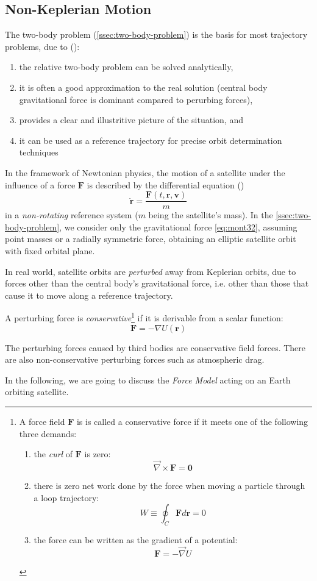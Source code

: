\subsection{Non-Keplerian Motion}
\label{ssec:non-keplerian}

The two-body problem (\ref{ssec:two-body-problem}) is the basis for most 
trajectory problems, due to (\cite{hintz}):
\begin{enumerate}
  \item the relative two-body problem can be solved analytically,
  \item it is often a good approximation to the real solution (central body 
    gravitational force is dominant compared to perurbing forces),
  \item provides a clear and illustritive picture of the situation, and
  \item it can be used as a reference trajectory for precise orbit 
    determination techniques
\end{enumerate}

In the framework of Newtonian physics, the motion of a satellite under the influence 
of a force $\bm{F}$ is described by the differential equation (\cite{Montenbruck2000})
\begin{equation}
  \bm{\ddot{r}} = \frac{\bm{F} (t, \bm{r}, \bm{v})}{m}
\end{equation}
in a \emph{non-rotating} reference system ($m$ being the satellite's mass).
In the \ref{ssec:two-body-problem}, we consider only the gravitational force 
\ref{eq:mont32}, assuming point masses or a radially symmetric force, obtaining 
an elliptic satellite orbit with fixed orbital plane.

In real world, satellite orbits are \emph{perturbed} away from Keplerian 
orbits, due to forces other than the central body's gravitational force, i.e. 
other than those that cause it to move along a reference trajectory.

A perturbing force is \emph{conservative}\footnote{
A force field $\bm{F}$ is is called a conservative force if it meets one of the 
following three demands:
  \begin{enumerate}
    \item the \emph{curl} of $\bm{F}$ is zero:\begin{equation}\vec{\nabla} \times \bm{F} = \bm{0}\end{equation}
    \item there is zero net work done by the force when moving a particle 
      through a loop trajectory:\begin{equation}W \equiv \oint _C \bm{F}d\bm{r}=0 \end{equation}
    \item the force can be written as the gradient of a potential:\begin{equation}\bm{F}=-\vec{\nabla} U\end{equation}
  \end{enumerate}
  } if it is derivable from a scalar 
function:
\begin{equation}
  \bm{F} = -\nabla U(\bm{r})
\end{equation}

The perturbing forces caused by third bodies are conservative field forces. 
There are also non-conservative perturbing forces such as atmospheric drag.

In the following, we are going to discuss the \emph{Force Model} acting on an 
Earth orbiting satellite.
